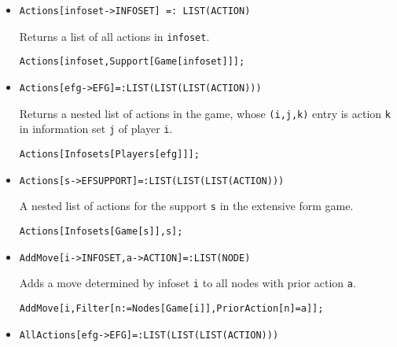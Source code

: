 \begin{itemize}

\item{}
\protect \large \begin{verbatim}
Actions[infoset->INFOSET] =: LIST(ACTION)
\end{verbatim}\normalsize

\bd 
Returns a list of all actions in \verb+infoset+.

\begin{verbatim}
Actions[infoset,Support[Game[infoset]]];
\end{verbatim} 
\ed

\item{}
\protect \large \begin{verbatim}
Actions[efg->EFG]=:LIST(LIST(LIST(ACTION)))
\end{verbatim}\normalsize

\bd 
Returns a nested list of actions in the game, whose  \verb+(i,j,k)+
entry is action \verb+k+ in information set \verb+j+ of player \verb+i+.

\begin{verbatim}
Actions[Infosets[Players[efg]]];
\end{verbatim} 
\ed

\item{}
\protect \large \begin{verbatim}
Actions[s->EFSUPPORT]=:LIST(LIST(LIST(ACTION)))
\end{verbatim}\normalsize

\bd 

A nested list of actions for the support \verb+s+ in the extensive
form game.

\begin{verbatim}
Actions[Infosets[Game[s]],s];    
\end{verbatim} 
\ed

\item{}
\protect \large \begin{verbatim}
AddMove[i->INFOSET,a->ACTION]=:LIST(NODE)
\end{verbatim}\normalsize

\bd 
Adds a move determined by infoset \verb+i+ to all nodes with prior
action \verb+a+.  
\begin{verbatim}
AddMove[i,Filter[n:=Nodes[Game[i]],PriorAction[n]=a]];
\end{verbatim} 
\ed

\item{}
\protect \large \begin{verbatim}
AllActions[efg->EFG]=:LIST(LIST(LIST(ACTION)))
\end{verbatim}\normalsize


\end{itemize}
